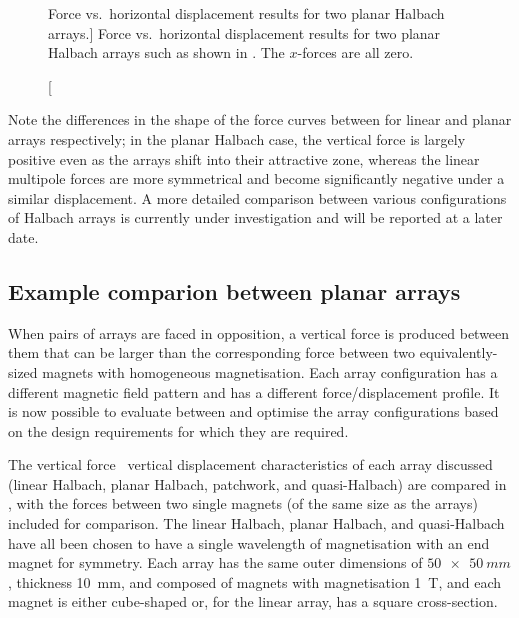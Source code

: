 \documentclass[11pt,a4paper]{memoir}
\begin{document}
\begin{figure}
\centering
{}
\caption
[Force vs.\ horizontal displacement results for two planar Halbach arrays.]
{Force vs.\ horizontal displacement results for two planar Halbach arrays such as shown in . The $x$-forces are all zero.}
\end{figure}

Note the differences in the shape of the force curves between  for linear and planar arrays respectively; in the planar Halbach case, the vertical force is largely positive even as the arrays shift into their attractive zone, whereas the linear multipole forces are more symmetrical and become significantly negative under a similar displacement.
A more detailed comparison between various configurations of Halbach arrays is currently under investigation and will be reported at a later date.

\subsection{Example comparion between planar arrays}

When pairs of arrays are faced in opposition, a vertical force is produced between them that can be larger than the corresponding force between two equivalently-sized magnets with homogeneous magnetisation.
Each array configuration has a different magnetic field pattern and has a different force/displacement profile.
It is now possible to evaluate between and optimise the array configurations based on the design requirements for which they are required.

The vertical force \vs\ vertical displacement characteristics of each array discussed (linear Halbach, planar Halbach, patchwork, and quasi-Halbach) are compared in , with the forces between two single magnets (of the same size as the arrays) included for comparison.
The linear Halbach, planar Halbach, and quasi-Halbach have all been chosen to have a single wavelength of magnetisation with an end magnet for symmetry.
Each array has the same outer dimensions of $\SI{50x50}{mm}$, thickness \SI{10}{mm}, and composed of magnets with magnetisation \SI{1}{T}, and each magnet is either cube-shaped or, for the linear array, has a square cross-section.
\end{document}
